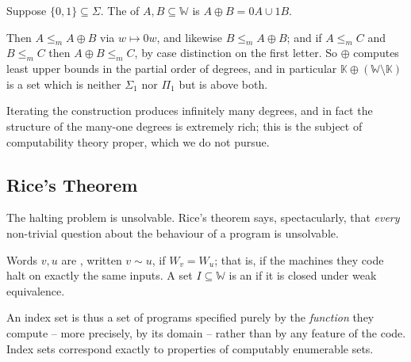 \documentclass[a4paper]{scrartcl}
\newcommand{\WW}{\mathbb{W}}
\newcommand{\KK}{\mathbb{K}}
\begin{document}
\begin{definition}
	Suppose $\{0,1\}\subseteq\Sigma$. The  of $A, B \subseteq \WW$ is $A \oplus B = 0A \cup 1B$.
\end{definition}

Then $A \leq_m A\oplus B$ via $w \mapsto 0w$, and likewise $B \leq_m A \oplus B$; and if $A \leq_m C$ and $B \leq_m C$ then $A \oplus B \leq_m C$, by case distinction on the first letter. So $\oplus$ computes least upper bounds in the partial order of degrees, and in particular $\KK \oplus (\WW\setminus\KK)$ is a set which is neither $\Sigma_1$ nor $\Pi_1$ but is above both.

\begin{center}
\end{center}

Iterating the construction produces infinitely many degrees, and in fact the structure of the many-one degrees is extremely rich; this is the subject of computability theory proper, which we do not pursue.

\subsection{Rice's Theorem}

The halting problem is unsolvable. Rice's theorem says, spectacularly, that \emph{every} non-trivial question about the behaviour of a program is unsolvable.

\begin{definition}
	Words $v, u$ are , written $v \sim u$, if $W_v = W_u$; that is, if the machines they code halt on exactly the same inputs. A set $I \subseteq \WW$ is an  if it is closed under weak equivalence.
\end{definition}

An index set is thus a set of programs specified purely by the \emph{function} they compute -- more precisely, by its domain -- rather than by any feature of the code. Index sets correspond exactly to properties of computably enumerable sets.
\end{document}
